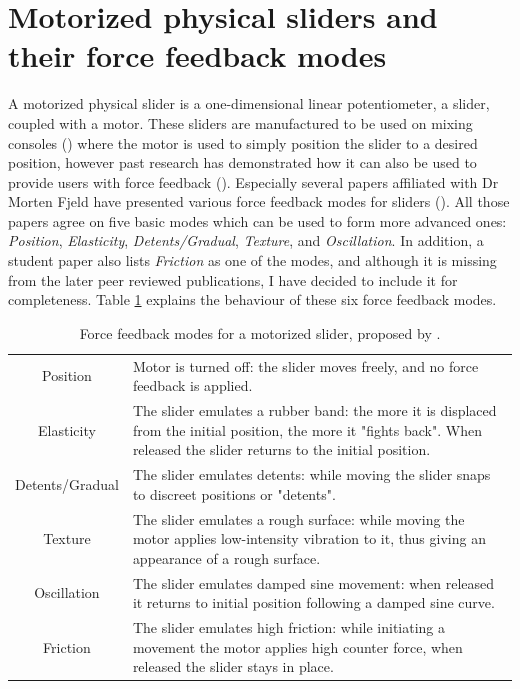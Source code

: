 \section{Motorized physical sliders and their force feedback modes}

A motorized physical slider is a one-dimensional linear potentiometer, a slider, coupled with a motor. These sliders are manufactured to be used on mixing consoles (\cite{bourns2020}) where the motor is used to simply position the slider to a desired position, however past research has demonstrated how it can also be used to provide users with force feedback (\cite{andersen2008, bak2015, beamish2004, berdahl-kontogeorgakopoulos2013, gillespie-rosenberg2005}). Especially several papers affiliated with Dr Morten Fjeld have presented various force feedback modes for sliders (\cite{jenaro2007, kretz2005, shahrokni2006}). All those papers agree on five basic modes which can be used to form more advanced ones: \textit{Position}, \textit{Elasticity}, \textit{Detents/Gradual}, \textit{Texture}, and \textit{Oscillation}. In addition, a student paper \textcite{kretz2004} also lists \textit{Friction} as one of the modes, and although it is missing from the later peer reviewed publications, I have decided to include it for completeness. Table \ref{fjeldmodes} explains the behaviour of these six force feedback modes.

\begin{table}[h!]
	\centering
	\begin{tabularx}{\textwidth}{ |c|X| }
		\hline
		\thead{Mode} & \thead{Description} \\
		\hline
		Position & Motor is turned off: the slider moves freely, and no force feedback is applied. \\
		\hline
		Elasticity & The slider emulates a rubber band: the more it is displaced from the initial position, the more it "fights back". When released the slider returns to the initial position. \\
		\hline
		Detents/Gradual & The slider emulates detents: while moving the slider snaps to discreet positions or "detents". \\
		\hline
		Texture & The slider emulates a rough surface: while moving the motor applies low-intensity vibration to it, thus giving an appearance of a rough surface. \\
		\hline
		Oscillation & The slider emulates damped sine movement: when released it returns to initial position following a damped sine curve. \\
		\hline
		Friction & The slider emulates high friction: while initiating a movement the motor applies high counter force, when released the slider stays in place. \\
		\hline
	\end{tabularx}
	\caption{Force feedback modes for a motorized slider, proposed by \textcite{kretz2004}.}
	\label{fjeldmodes}
\end{table}

